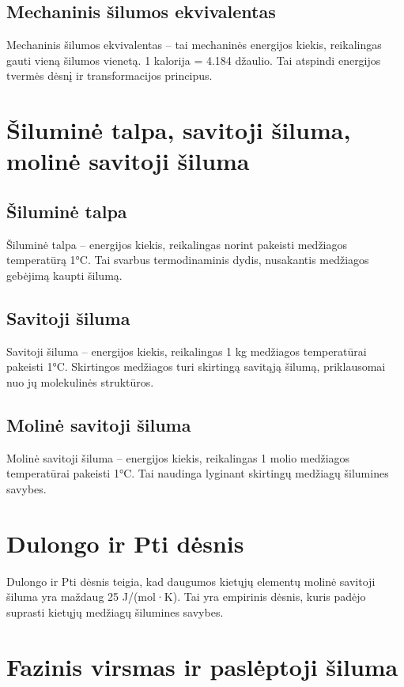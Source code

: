 \documentclass[a4paper,12pt]{article}
\begin{document}
\subsection{Mechaninis šilumos ekvivalentas}
Mechaninis šilumos ekvivalentas – tai mechaninės energijos kiekis, reikalingas gauti vieną šilumos vienetą. 1 kalorija = 4.184 džaulio. Tai atspindi energijos tvermės dėsnį ir transformacijos principus.

\section{Šiluminė talpa, savitoji šiluma, molinė savitoji šiluma}

\subsection{Šiluminė talpa}
Šiluminė talpa – energijos kiekis, reikalingas norint pakeisti medžiagos temperatūrą 1°C. Tai svarbus termodinaminis dydis, nusakantis medžiagos gebėjimą kaupti šilumą.

\subsection{Savitoji šiluma}
Savitoji šiluma – energijos kiekis, reikalingas 1 kg medžiagos temperatūrai pakeisti 1°C. Skirtingos medžiagos turi skirtingą savitąją šilumą, priklausomai nuo jų molekulinės struktūros.

\subsection{Molinė savitoji šiluma}
Molinė savitoji šiluma – energijos kiekis, reikalingas 1 molio medžiagos temperatūrai pakeisti 1°C. Tai naudinga lyginant skirtingų medžiagų šilumines savybes.

\section{Dulongo ir Pti dėsnis}

Dulongo ir Pti dėsnis teigia, kad daugumos kietųjų elementų molinė savitoji šiluma yra maždaug 25 J/(mol·K). Tai yra empirinis dėsnis, kuris padėjo suprasti kietųjų medžiagų šilumines savybes.

\section{Fazinis virsmas ir paslėptoji šiluma}
\end{document}
